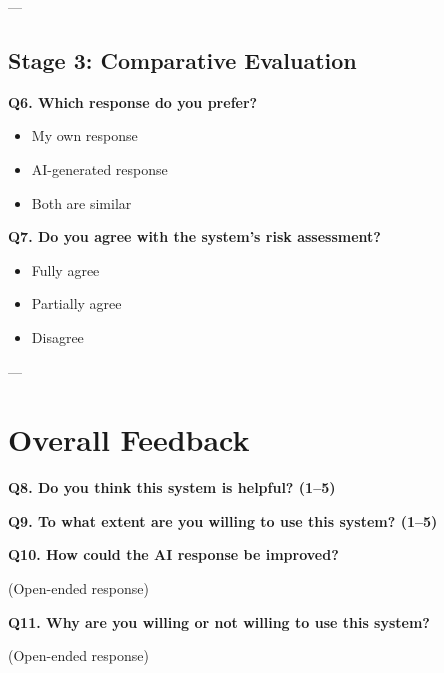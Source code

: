 \documentclass[12pt,a4paper]{report}
\begin{document}
---

\subsection{Stage 3: Comparative Evaluation}

\textbf{Q6. Which response do you prefer?}

\begin{itemize}
    \item My own response
    \item AI-generated response
    \item Both are similar
\end{itemize}

\vspace{0.3cm}

\textbf{Q7. Do you agree with the system's risk assessment?}

\begin{itemize}
    \item Fully agree
    \item Partially agree
    \item Disagree
\end{itemize}

---

\section{Overall Feedback}

\textbf{Q8. Do you think this system is helpful? (1–5)}

\vspace{0.3cm}

\textbf{Q9. To what extent are you willing to use this system? (1–5)}

\vspace{0.3cm}

\textbf{Q10. How could the AI response be improved?}

(Open-ended response)

\vspace{0.3cm}

\textbf{Q11. Why are you willing or not willing to use this system?}

(Open-ended response)

\clearpage
\renewcommand{\bibname}{References}

\begingroup
\setlength{\bibhang}{0pt}
\setlength{\bibsep}{0.5em}

\end{document}
